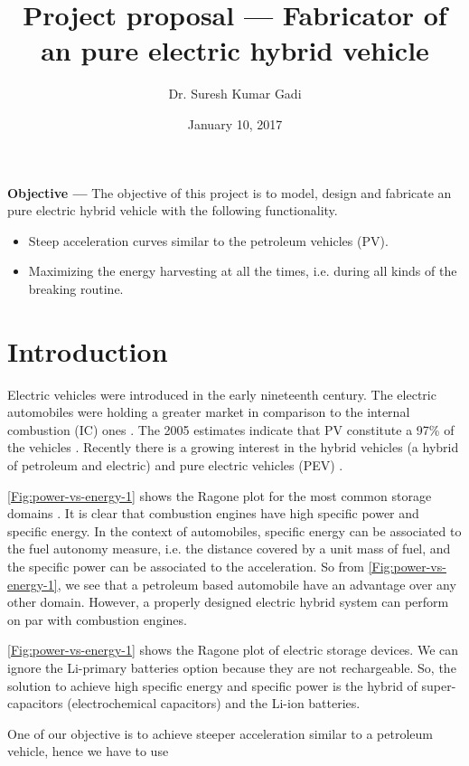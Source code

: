 \documentclass[journal]{IEEEtran}
\title{Project proposal --- Fabricator of an pure electric hybrid vehicle}
\date {January 10, 2017}
\author{Dr. Suresh Kumar Gadi}
\begin{document}
\maketitle
\textbf{Objective ---} The objective of this project is to model, design and fabricate an pure electric hybrid vehicle with the following functionality.
\begin{itemize}
	\item Steep acceleration curves similar to the petroleum vehicles (PV).
	\item Maximizing the energy harvesting at all the times, i.e. during all kinds of the breaking routine.
\end{itemize}
\section{Introduction}
Electric vehicles were introduced in the early nineteenth century. The electric automobiles were holding a greater market in comparison to the internal combustion (IC) ones \cite{6487583}. The 2005 estimates indicate that PV constitute a 97\% of the vehicles \cite{de2012electrical}. Recently there is a growing interest in the hybrid vehicles (a hybrid of petroleum and electric) and pure electric vehicles (PEV) \cite{hori2004future, turrentine1995will, SKGadi-2016EuropeReportEV}.

\autoref{Fig:power-vs-energy-1} shows the Ragone plot for the most common storage domains \cite{simon2008materials}. It is clear that combustion engines have high specific power and specific energy. In the context of automobiles, specific energy can be associated to the fuel autonomy measure, i.e. the distance covered by a unit mass of fuel, and the specific power can be associated to the acceleration. So from \autoref{Fig:power-vs-energy-1}, we see that a petroleum based automobile have an advantage over any other domain. However, a properly designed electric hybrid system can perform on par with combustion engines.

\autoref{Fig:power-vs-energy-1} shows the Ragone plot of electric storage devices. We can ignore the Li-primary batteries option because they are not rechargeable. So, the solution to achieve high specific energy and specific power is the hybrid of super-capacitors (electrochemical capacitors) and the Li-ion batteries.



 One of our objective is to achieve steeper acceleration similar to a petroleum vehicle, hence we have to use 
\end{document}
